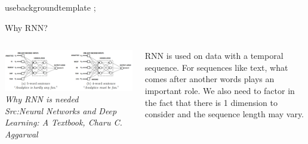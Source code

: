 usebackgroundtemplate{%
 ;
}
\begin{frame}
\end{frame}

\usebackgroundtemplate{ }

\begin{frame}{Why RNN?}
	\begin{columns}[T]
        \begin{column}{0.7\textwidth}
			\includegraphics[width=\textwidth]{images/why RNN.png}
			\tiny{\textit{Why RNN is needed\\Src:Neural Networks and Deep Learning: A Textbook, Charu C. Aggarwal }}
        \end{column}
	    \begin{column}{0.3\textwidth} 
			RNN is used on data with a temporal sequence. For sequences like text, what comes after another words plays an important role. We also need to factor in the fact that there is 1 dimension to consider and the sequence length may vary. 
    	\end{column}
    \end{columns}
\end{frame}

